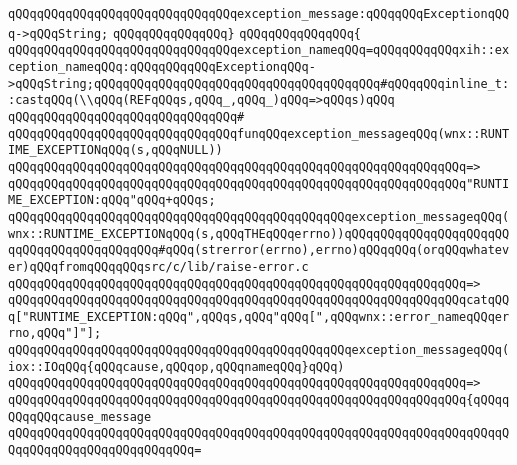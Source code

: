 \verb|qQQqqQQqqQQqqQQqqQQqqQQqqQQqqQQqexception_message:qQQqqQQqExceptionqQQq->qQQqString;|\newline
\verb|qQQqqQQqqQQqqQQq}|\newline
\verb|qQQqqQQqqQQqqQQq{|\newline
\verb|qQQqqQQqqQQqqQQqqQQqqQQqqQQqqQQqexception_nameqQQq=qQQqqQQqqQQqxih::exception_nameqQQq:qQQqqQQqqQQqExceptionqQQq->qQQqString;qQQqqQQqqQQqqQQqqQQqqQQqqQQqqQQqqQQqqQQq#qQQqqQQqinline_t::castqQQq(\\qQQq(REFqQQqs,qQQq_,qQQq_)qQQq=>qQQqs)qQQq|\newline
\newline
\verb|qQQqqQQqqQQqqQQqqQQqqQQqqQQqqQQq#|\newline
\verb|qQQqqQQqqQQqqQQqqQQqqQQqqQQqqQQqfunqQQqexception_messageqQQq(wnx::RUNTIME_EXCEPTIONqQQq(s,qQQqNULL))|\newline
\verb|qQQqqQQqqQQqqQQqqQQqqQQqqQQqqQQqqQQqqQQqqQQqqQQqqQQqqQQqqQQqqQQq=>|\newline
\verb|qQQqqQQqqQQqqQQqqQQqqQQqqQQqqQQqqQQqqQQqqQQqqQQqqQQqqQQqqQQqqQQq"RUNTIME_EXCEPTION:qQQq"qQQq+qQQqs;|\newline
\newline
\newline
\verb|qQQqqQQqqQQqqQQqqQQqqQQqqQQqqQQqqQQqqQQqqQQqqQQqexception_messageqQQq(wnx::RUNTIME_EXCEPTIONqQQq(s,qQQqTHEqQQqerrno))qQQqqQQqqQQqqQQqqQQqqQQqqQQqqQQqqQQqqQQqqQQq#qQQq(strerror(errno),errno)qQQqqQQq(orqQQqwhatever)qQQqfromqQQqqQQqsrc/c/lib/raise-error.c|\newline
\verb|qQQqqQQqqQQqqQQqqQQqqQQqqQQqqQQqqQQqqQQqqQQqqQQqqQQqqQQqqQQqqQQq=>|\newline
\verb|qQQqqQQqqQQqqQQqqQQqqQQqqQQqqQQqqQQqqQQqqQQqqQQqqQQqqQQqqQQqqQQqcatqQQq["RUNTIME_EXCEPTION:qQQq",qQQqs,qQQq"qQQq[",qQQqwnx::error_nameqQQqerrno,qQQq"]"];|\newline
\newline
\newline
\verb|qQQqqQQqqQQqqQQqqQQqqQQqqQQqqQQqqQQqqQQqqQQqqQQqexception_messageqQQq(iox::IOqQQq{qQQqcause,qQQqop,qQQqnameqQQq}qQQq)|\newline
\verb|qQQqqQQqqQQqqQQqqQQqqQQqqQQqqQQqqQQqqQQqqQQqqQQqqQQqqQQqqQQqqQQq=>|\newline
\verb|qQQqqQQqqQQqqQQqqQQqqQQqqQQqqQQqqQQqqQQqqQQqqQQqqQQqqQQqqQQqqQQq{qQQqqQQqqQQqcause_message|\newline
\verb|qQQqqQQqqQQqqQQqqQQqqQQqqQQqqQQqqQQqqQQqqQQqqQQqqQQqqQQqqQQqqQQqqQQqqQQqqQQqqQQqqQQqqQQqqQQqqQQq=|\newline
